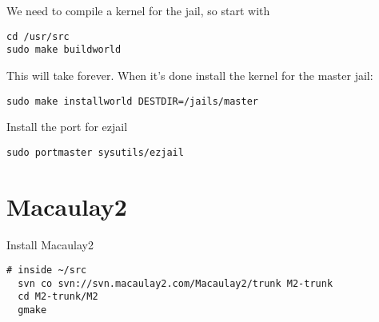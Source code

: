 \documentclass[a4paper]{article}
\begin{document}
We need to compile a kernel for the jail, so start with

\begin{verbatim}
cd /usr/src
sudo make buildworld
\end{verbatim}

This will take forever.
When it's done install the kernel for the master jail:

\begin{verbatim}
sudo make installworld DESTDIR=/jails/master
\end{verbatim}

Install the port for ezjail

\begin{verbatim}
sudo portmaster sysutils/ezjail
\end{verbatim}

\section{Macaulay2}
Install Macaulay2

\begin{verbatim}
# inside ~/src
  svn co svn://svn.macaulay2.com/Macaulay2/trunk M2-trunk
  cd M2-trunk/M2
  gmake

\end{verbatim}
\end{document}
